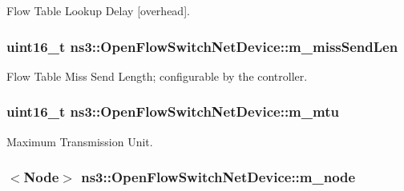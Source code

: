 Flow Table Lookup Delay \mbox{[}overhead\mbox{]}. 

\subsubsection[{\texorpdfstring{m\+\_\+miss\+Send\+Len}{m_missSendLen}}]{\setlength{\rightskip}{0pt plus 5cm}uint16\+\_\+t ns3\+::\+Open\+Flow\+Switch\+Net\+Device\+::m\+\_\+miss\+Send\+Len\hspace{0.3cm}{\ttfamily [private]}}\hypertarget{classns3_1_1OpenFlowSwitchNetDevice_a7437e1b44dc68e7f7f2efc1fabae7fdd}{}\label{classns3_1_1OpenFlowSwitchNetDevice_a7437e1b44dc68e7f7f2efc1fabae7fdd}


Flow Table Miss Send Length; configurable by the controller. 

\subsubsection[{\texorpdfstring{m\+\_\+mtu}{m_mtu}}]{\setlength{\rightskip}{0pt plus 5cm}uint16\+\_\+t ns3\+::\+Open\+Flow\+Switch\+Net\+Device\+::m\+\_\+mtu\hspace{0.3cm}{\ttfamily [private]}}\hypertarget{classns3_1_1OpenFlowSwitchNetDevice_a32d177d10cd1c5a266db9f4014cd7384}{}\label{classns3_1_1OpenFlowSwitchNetDevice_a32d177d10cd1c5a266db9f4014cd7384}


Maximum Transmission Unit. 

\subsubsection[{\texorpdfstring{m\+\_\+node}{m_node}}]{$<${\bf Node}$>$ ns3\+::\+Open\+Flow\+Switch\+Net\+Device\+::m\+\_\+node\hspace{0.3cm}{\ttfamily [private]}}\hypertarget{classns3_1_1OpenFlowSwitchNetDevice_a0a4333cc4bfb15852c2d9f87e801cbd8}{}\label{classns3_1_1OpenFlowSwitchNetDevice_a0a4333cc4bfb15852c2d9f87e801cbd8}


